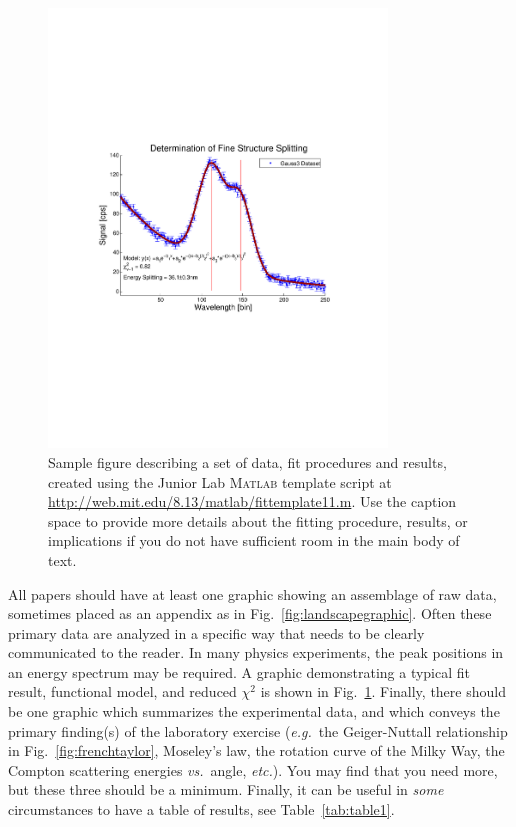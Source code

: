 \begin{figure}[htb]
\includegraphics[width=9cm]{sample-fig2.pdf}
\caption{Sample figure describing a set of data, fit procedures and
results, created using the Junior Lab \textsc{Matlab} template script at
\url{http://web.mit.edu/8.13/matlab/fittemplate11.m}. Use the caption space to provide more details about the
fitting procedure, results, or implications if you do not have
sufficient room in the main body of text.}
\label{fig:calibration}
\end{figure}

All papers should have at least one graphic showing an assemblage
of raw data, sometimes placed as an appendix as in
Fig.~\ref{fig:landscapegraphic}. Often these primary data are
analyzed in a specific way that needs to be clearly communicated to
the reader.  In many physics experiments, the peak positions in an
energy spectrum may be required. A graphic demonstrating a typical
fit result, functional model, and reduced $\chi^2$ is shown in
Fig.~\ref{fig:calibration}. Finally, there should be one graphic
which summarizes the experimental data, and which conveys the primary
finding(s) of the laboratory exercise (\textit{e.g.}\ the Geiger-Nuttall
relationship in Fig.~\ref{fig:frenchtaylor}, Moseley's law, the
rotation curve of the Milky Way, the Compton scattering energies \textit{vs.}\
angle, \textit{etc.}). You may find that you need more, but these three should
be a minimum. Finally, it can be useful in \emph{some} circumstances to
have a table of results, see Table~\ref{tab:table1}.

